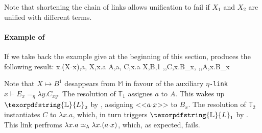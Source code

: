 \documentclass[sigconf,natbib=false,review]{acmart}
\newcommand{\appsep}{\ensuremath{\textcolor{lightgray}{\cdot}}}
\newcommand{\UnifRel}{\ensuremath{\simeq}}
\newcommand{\Ue}{\ensuremath{\UnifRel_\lambda}\xspace}
\newcommand{\linkMacro}[1]{\ensuremath{#1}\texttt{-link}\xspace}
\newcommand{\linketa} {\linkMacro{\eta}}
\newcommand{\Fo}{\texorpdfstring{\ensuremath{\mathcal{F}\xspace}}{F}} %
\newcommand{\linketaM}[3]{\ensuremath{#1 \vdash #2 =_\eta #3}}
\newcommand{\mapping}[3]{\ensuremath{#1 \mapsto #2^#3}}
\newcommand{\rhs}{rhs\xspace}
\newcommand{\linkStore}{\texorpdfstring{\ensuremath{\mathbb{L}}\xspace}{L}}
\newcommand{\mapStore}{\texorpdfstring{\ensuremath{\mathbb{M}}\xspace}{M}}
\newcommand{\hoUnifPb}{\ensuremath{\mathbb{T}}\xspace}
\begin{document}
\noindent
Note that shortening the chain of links allows unification to fail if
$X_1$ and $X_2$ are unified with different terms.

\paragraph{Example of \mapdeduplication}
If we take back the example give at the beginning of this section,
\mapdeduplication produces the following result:
% 
\printAlll
  {{{\lambda x.(X\appsep x),a},
    {X,\lambda x.a}}}
  {{{A,a},
    {C,\lambda x.a}}}
  {{{X,B,1}}}
  {{{\eta,,C,\lambda x.B_{x}},
    {\eta,,A,\lambda x.B_{x}}}}

\noindent
Note that $\mapping{X}{B}{1}$ desappears from \mapStore
in favour of the auxiliary \linketa \linketaM{x}{E_{x}}{\lambda y.C_{x y}}.
The resolution of $\hoUnifPb_1$ assignes $a$ to $A$. This wakes up
$\linkStore_2$ by \progressetaleft, assigning <<$a \appsep x$>> to $B_x$.
The resolution of $\hoUnifPb_2$ instantiates $C$ to $\lambda x.a$, which, in
turn triggers $\linkStore_1$ by \progressetaleft. This link perfroms
$\lambda x.a \Ue \lambda x.(a \appsep x)$, which, as expected, fails.

\begin{comment}
\printAlll
  {{{\lambda x.\lambda y.(X\appsep y\appsep x),\lambda x.\lambda y.x},
    {\lambda x.(f\appsep (X\appsep x)\appsep x),Y}}}
  {{{A,\lambda x.\lambda y.x},
    {D,F}}}
  {{{Y,F,0},
    {X,C,2}}}
  {{{\eta,x,E_{x},\lambda y.C_{x y}},
    {\eta,,D,\lambda x.(f\appsep E_{x}\appsep x)},
    {\eta,,A,\lambda x.B_{x}},
    {\eta,x,B_{x},\lambda y.C_{y x}}}}

\noindent
The resolution of $\hoUnifPb_1$ assigns $\lambda x.\lambda y.x$ to $A$
that in turn triggers $\linkStore_3$ and then $\linkStore_4$ by \progressetaleft,
one per $\lambda$ in the solution of $A$.
The unification variable $C_{yx}$ is therefore unified with $x$
(the second variable of its scope).
As a result $\linkStore_1$ becomes \linketaM{x}{E_x}{\lambda y.y},
and the \rhs is no more in \maybeeta so \progressetaright fires and
$E_x$ is unified with $\lambda y.y$; then $\linkStore_2$ makes progress thanks to the same 
rule giving
$\sigma = \{~ A \mapsto \lambda x.\lambda y.x ~;~ B_x \mapsto \lambda y.x ~;~ C_{yx} \mapsto x ~;~ D \mapsto f\appsep (\lambda y.y) ~;~ E_x \mapsto \lambda y.y ~\}$.\\
The remaining step $\hoUnifPb_2$ identifies $D$ with $F$,
hence the resulting \Fo{} substitution is
$\rho = \{X \mapsto \lambda x.\lambda y.y ~;~ Y \mapsto f\appsep (\lambda y.y)\}$.
\end{comment}
\end{document}
